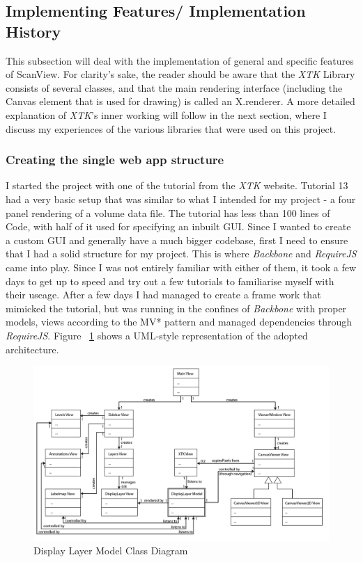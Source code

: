 \documentclass[a4paper,11pt,twoside]{article}
\begin{document}
\subsection{Implementing Features/ Implementation History}

This subsection will deal with the implementation of general and specific features of ScanView. For clarity's sake, the reader should be aware that the \textit{XTK} Library consists of several classes, and that the main rendering interface (including the Canvas element that is used for drawing) is called an X.renderer. A more detailed explanation of \textit{XTK}'s inner working will follow in the next section, where I discuss my experiences of the various libraries that were used on this project.


\subsubsection{Creating the single web app structure}

I started the project with one of the tutorial from the \textit{XTK} website. Tutorial 13 had a very basic setup that was similar to what I intended for my project - a four panel rendering of a volume data file. The tutorial has less than 100 lines of Code, with half of it used for specifying an inbuilt GUI. Since I wanted to create a custom GUI and generally have a much bigger codebase, first I need to ensure that I had a solid structure for my project. This is where \textit{Backbone} and \textit{RequireJS} came into play. Since I was not entirely familiar with either of them, it took a few days to get up to speed and try out a few tutorials to familiarise myself with their useage. After a few days I had managed to create a frame work that mimicked the tutorial, but was running in the confines of \textit{Backbone} with proper models, views according to the MV* pattern and managed dependencies through \textit{RequireJS}. Figure ~\ref{fig:generalUML} shows a UML-style representation of the adopted architecture. 

\begin{figure}[ht!]
\centering
\includegraphics[width=165mm]{graphics/generalUML_v01.png}
\caption{Display Layer Model Class Diagram}
\label{fig:generalUML}
\end{figure}
\end{document}
